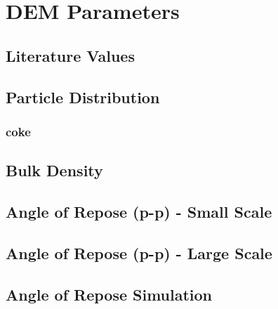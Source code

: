 
\chapter{DEM Parameters}
\label{cap:demparameters}

\lipsum[1]

\section{Literature Values}
\label{sec:literaturevalues}

\lipsum[1]

\section{Particle Distribution}
\label{sec:particledistribution}

\lipsum[1]

\subsection{coke}
\label{subsec:coke}

\lipsum[2]

\section{Bulk Density}
\label{sec:bulkdensity}


\lipsum[1]


\section{Angle of Repose (p-p) - Small Scale}
\label{sec:aor}


\lipsum[1]

\section{Angle of Repose (p-p) - Large Scale}
\label{sec:aorlargescale}


\lipsum[1]

\section{Angle of Repose Simulation}
\label{sec:aorsimulation}


